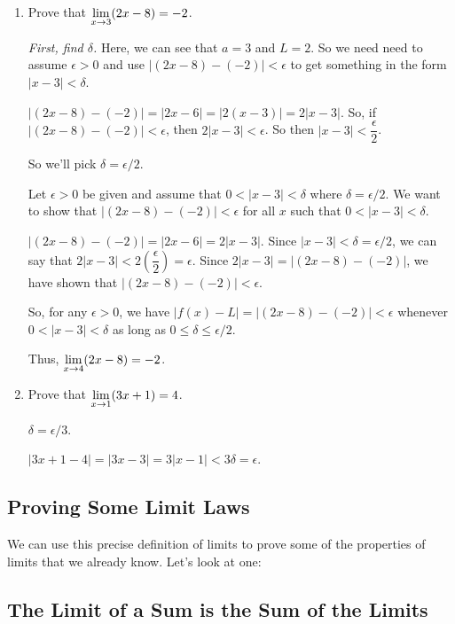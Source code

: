 \begin{enumerate}
  \item Prove that $\displaystyle \lim_{x\to3}(2x-8)=-2$.

  \textit{First, find $\delta$.}
  Here, we can see that $a=3$ and $L=2$.
  So we need need to assume $\epsilon>0$ and use $|(2x-8)-(-2)|<\epsilon$ to get something in the form $|x-3|<\delta$.

  $|(2x-8)-(-2)| = |2x-6| = |2(x-3)| = 2|x-3|$.
  So, if $|(2x-8)-(-2)|<\epsilon$, then $2|x-3|<\epsilon$.
  So then $|x-3|<\dfrac{\epsilon}{2}$.

  So we'll pick $\delta=\epsilon/2$.

  \begin{prf}{}
    Let $\epsilon>0$ be given and assume that $0<|x-3|<\delta$ where $\delta=\epsilon/2$.
    We want to show that $|(2x-8)-(-2)|<\epsilon$ for all $x$ such that $0<|x-3|<\delta$.

    $|(2x-8)-(-2)| = |2x-6| = 2|x-3|$.
    Since $|x-3|<\delta = \epsilon/2$, we can say that $2|x-3|<2\left(\dfrac{\epsilon}{2}\right) = \epsilon$.
    Since $2|x-3| = |(2x-8)-(-2)|$, we have shown that $|(2x-8)-(-2)|<\epsilon$.

    So, for any $\epsilon>0$, we have $|f(x)-L| = |(2x-8)-(-2)|<\epsilon$ whenever $0<|x-3|<\delta$ as long as $0\leq\delta\leq\epsilon/2$.

    Thus, $\displaystyle \lim_{x\to 4} (2x-8)=-2$.
  \end{prf}


  \item Prove that $\displaystyle \lim_{x\to1}(3x+1)=4$.

  $\delta = \epsilon/3$.

  \begin{prf}{}
    $|3x+1-4|=|3x-3|=3|x-1|<3\delta = \epsilon$.
  \end{prf}
  \end{enumerate}

\subsection*{Proving Some Limit Laws}

We can use this precise definition of limits to prove some of the properties of limits that we already know.
Let's look at one:

\subsection{The Limit of a Sum is the Sum of the Limits}

